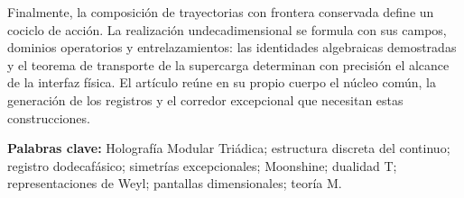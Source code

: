 Finalmente, la composición de trayectorias con frontera conservada
define un cociclo de acción. La realización undecadimensional se formula
con sus campos, dominios operatorios y entrelazamientos: las identidades
algebraicas demostradas y el teorema de transporte de la supercarga
determinan con precisión el alcance de la interfaz física. El artículo
reúne en su propio cuerpo el núcleo común, la generación de los registros
y el corredor excepcional que necesitan estas construcciones.

\medskip
\noindent\textbf{Palabras clave:} Holografía Modular Triádica; estructura
discreta del continuo; registro dodecafásico; simetrías excepcionales;
Moonshine; dualidad T; representaciones de Weyl; pantallas dimensionales;
teoría M.
